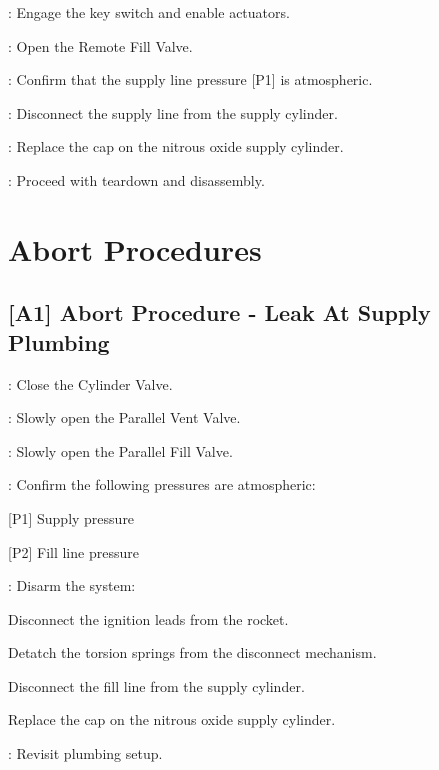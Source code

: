 \begin{checklist}
    \item \control{}: Engage the key switch and enable actuators.
    \item \control{}: Open the Remote Fill Valve.
    \item \control{}: Confirm that the supply line pressure [P1] is atmospheric.
    \item \primary{}: Disconnect the supply line from the supply cylinder.
    \item \primary{}: Replace the cap on the nitrous oxide supply cylinder.
    \item \ops{}: Proceed with teardown and disassembly.
\setcounter{checklistnum}{0}
\newpage
    
\section{Abort Procedures} 
\subsection{[A1] Abort Procedure - Leak At Supply Plumbing}
\begin{checklist}
    \item \primary{}: Close the Cylinder Valve.
    \item \primary{}: Slowly open the Parallel Vent Valve.
    \item \primary{}: Slowly open the Parallel Fill Valve.
    \item \control{}: Confirm the following pressures are atmospheric:
    \begin{checklist}
        \item {[P1]} Supply pressure
        \item {[P2]} Fill line pressure
    \end{checklist}
    \item \primary{}: Disarm the system:
        \begin{checklist}    
            \item Disconnect the ignition leads from the rocket.
            \item Detatch the torsion springs from the disconnect mechanism.
            \item Disconnect the fill line from the supply cylinder.
            \item Replace the cap on the nitrous oxide supply cylinder.
        \end{checklist}
    \item \ops{}: Revisit plumbing setup.
\end{checklist}
\setcounter{checklistnum}{0}


\end{checklist}

